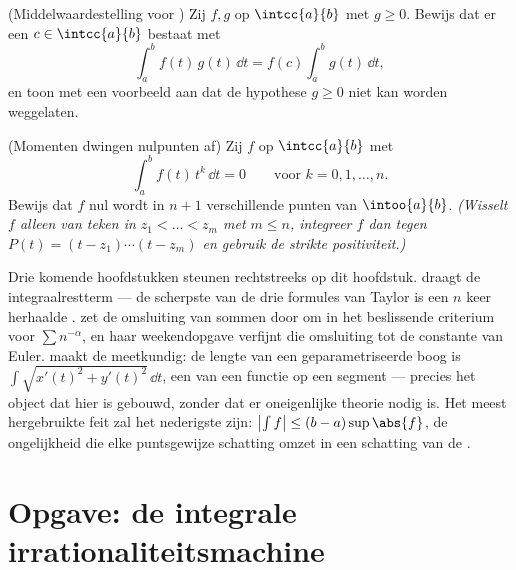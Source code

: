 \begin{exercise}[$\star\star$]\label{exo:b1:integration:11}
(Middelwaardestelling voor ) Zij $f, g$  op
$\intcc{a}{b}$ met $g \geq 0$. Bewijs dat er een $c \in
\intcc{a}{b}$ bestaat met
\[
\int_a^b f(t)\,g(t)\,\dd t = f(c)\int_a^b g(t)\,\dd t ,
\]
en toon met een voorbeeld aan dat de hypothese $g \geq 0$ niet kan
worden weggelaten.
\end{exercise}

\begin{exercise}[$\star\star\star$]\label{exo:b1:integration:12}
(Momenten dwingen nulpunten af) Zij $f$  op $\intcc{a}{b}$
met
\[
\int_a^b f(t)\,t^k\,\dd t = 0 \qquad \text{voor } k = 0, 1,
\dots, n .
\]
Bewijs dat $f$ nul wordt in $n + 1$ verschillende punten van
$\intoo{a}{b}$. \emph{(Wisselt $f$ alleen van teken in $z_1 <
\dots < z_m$ met $m \leq n$, integreer $f$ dan tegen $P(t) = (t -
z_1) \cdots (t - z_m)$ en gebruik de strikte positiviteit.)}
\end{exercise}

\begin{remark}
Drie komende hoofdstukken steunen rechtstreeks op dit hoofdstuk.
 draagt de integraalrestterm --- de scherpste
van de drie formules van Taylor is een $n$ keer herhaalde
.  zet de omsluiting van
sommen door  om in het beslissende criterium voor $\sum
n^{-\alpha}$, en haar weekendopgave verfijnt die omsluiting tot
de constante van Euler.  maakt de 
meetkundig: de lengte van een geparametriseerde boog is $\int
\sqrt{x'(t)^2 + y'(t)^2}\,\dd t$, een  van een 
functie op een segment --- precies het object dat hier is
gebouwd, zonder dat er oneigenlijke theorie nodig is. Het meest
hergebruikte feit zal het nederigste zijn: $\bigl|\int f\bigr|
\leq (b - a)\sup\abs{f}$, de ongelijkheid die elke puntsgewijze
schatting omzet in een schatting van de .
\end{remark}

\section{Opgave: de integrale irrationaliteitsmachine}

